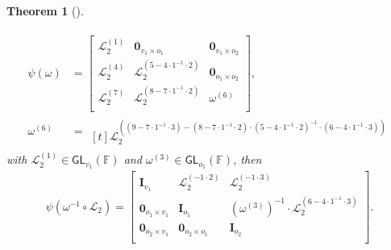 \documentclass[12pt, a4paper, oneside]{memoir}
\newtheorem{theorem}{Theorem}[section]
\theoremstyle{definition}
\begin{document}
\begin{theorem}[{\cite[Theorem 3.6]{Petzoldt:201307}}]
\begin{enumerate}
    \begin{align}
      \begin{split}
        \psi(\omega) &=
        \begin{bmatrix}
          \mathcal{L}_{2}^{(1)} & \mathbf{0}_{v_{1} \times o_{1}} & \mathbf{0}_{v_{1} \times o_{2}} \\
          \mathcal{L}_{2}^{(4)} & \mathcal{L}_{2}^{(5 - 4 \cdot 1^{-1} \cdot 2)} & \mathbf{0}_{o_{1} \times o_{2}} \\
          \mathcal{L}_{2}^{(7)} & \mathcal{L}_{2}^{(8 - 7 \cdot 1^{-1} \cdot 2)} & \omega^{(6)} \\
        \end{bmatrix}, \\
        \omega^{(6)} &=
        \begin{multlined}[t]
          \mathcal{L}_{2}^{((9 - 7 \cdot 1^{-1} \cdot 3) -(8 - 7 \cdot 1^{-1} \cdot 2) \cdot (5 - 4 \cdot 1^{-1} \cdot 2)^{-1} \cdot (6 - 4 \cdot 1^{-1} \cdot 3))}
        \end{multlined}
      \end{split}
    \end{align}
    with $\mathcal{L}_{2}^{(1)} \in \mathsf{GL}_{v_{1}}(\mathbb{F})$ and $\omega^{(3)} \in \mathsf{GL}_{o_{1}}(\mathbb{F})$, then
    \begin{align}
      \psi(\omega^{-1} \circ \mathcal{L}_{2}) =
      \begin{bmatrix}
        \mathbf{I}_{v_{1}} & \mathcal{L}_{2}^{(-1 \cdot 2)} & \mathcal{L}_{2}^{(-1 \cdot 3)} \\
        \mathbf{0}_{o_{1} \times v_{1}} & \mathbf{I}_{o_{1}} & (\omega^{(3)})^{-1} \cdot \mathcal{L}_{2}^{(6 - 4 \cdot 1^{-1} \cdot 3)} \\
        \mathbf{0}_{o_{2} \times v_{1}} & \mathbf{0}_{o_{2} \times o_{1}} & \mathbf{I}_{o_{2}} \\
      \end{bmatrix}.
    \end{align}
  \end{enumerate}
\end{theorem}
\end{document}
